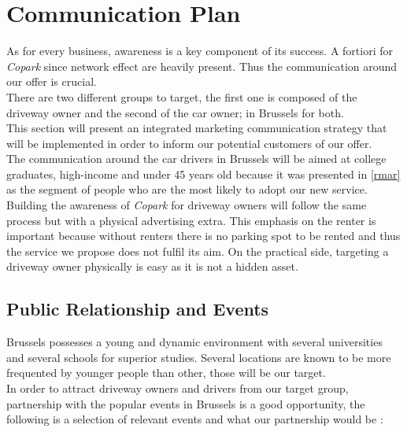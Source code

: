 \documentclass[12pt,a4paper,oneside]{book}
\newcommand{\bp}{\textit{Copark}}
\begin{document}
\section{Communication Plan}

As for every business, awareness is a key component of its success. A fortiori for \bp{} since network effect are heavily present. Thus the communication around our offer is crucial.\\

There are two different groups to target, the first one is composed of the driveway owner and the second of the car owner; in Brussels for both.\\

This section will present an integrated marketing communication strategy that will be implemented in order to inform our potential customers of our offer.\\

The communication around the car drivers in Brussels will be aimed at college graduates, high-income and under 45 years old because it was presented in \autoref{rmar} as the segment of people who are the most likely to adopt our new service. Building the awareness of \bp{} for driveway owners will follow the same process but with a physical advertising extra. This emphasis on the renter is important because without renters there is no parking spot to be rented and thus the service we propose does not fulfil its aim. On the practical side, targeting a driveway owner physically is easy as it is not a hidden asset.

\subsection{Public Relationship and Events}
\label{praess}
Brussels possesses a young and dynamic environment with several universities and several schools for superior studies. Several locations are known to be more frequented by younger people than other, those will be our target.\\

In order to attract driveway owners and drivers from our target group, partnership with the popular events in Brussels is a good opportunity, the following is a selection of relevant events and what our partnership would be :
\end{document}
